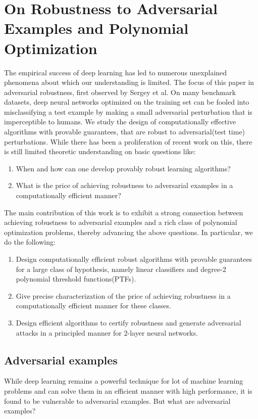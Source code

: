 \documentclass[12pt]{article}
\begin{document}
    \section{On Robustness to Adversarial Examples and Polynomial Optimization}
    The empirical success of deep learning has led to numerous unexplained phenomena about which our understanding is limited. The focus of this paper in adversarial robustness, first observed by Sergey et al. On many benchmark datasets, deep neural networks optimized on the training set can be fooled into misclassifying a test example by making a small adversarial perturbation that is imperceptible to humans.
    We study the design of computationally effective algorithms with provable guarantees, that are robust to adversarial(test time) perturbations. While there has been a proliferation of recent work on this, there is still limited theoretic understanding on basic questions like:
    \begin{enumerate}
        \item {When and how can one develop provably robust learning algorithms?}
        \item {What is the price of achieving robustness to adversarial examples in a computationally efficient manner? }
    \end{enumerate}
    The main contribution of this work is to exhibit a strong connection between achieving robustness to adversarial examples and a rich class of polynomial optimization problems, thereby advancing the above questions. In particular, we do the following:
    \begin{enumerate}
        \item {Design computationally efficient robust algorithms  with provable guarantees for a large class of hypothesis, namely linear classifiers and degree-2 polynomial threshold functions(PTFs).}
        \item {Give precise characterization of the price of achieving robustness in a computationally efficient manner for these classes. }
        \item {Design efficient algorithms to certify robustness and generate adversarial attacks in a principled manner for 2-layer neural networks. }
    \end{enumerate}
    \subsection{Adversarial examples}
    While deep learning remains a powerful technique for lot of machine learning problems and can solve them in an efficient manner with high performance, it is found to be vulnerable to adversarial examples. But what are adversarial examples? \\
    
\end{document}
